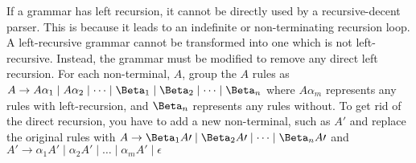 If a grammar has left recursion, it cannot be directly used by a recursive-decent parser. This is because it leads to an
 indefinite or non-terminating recursion loop. A left-recursive grammar cannot be transformed into one which is not left-
recursive. Instead, the grammar must be modified to remove any direct left recursion. For each non-terminal, $A$, group
 the $A$ rules as $A \rightarrow A\alpha_1 \mid A\alpha_2 \mid \dots \mid \Beta_1 \mid \Beta_2 \mid \dots \mid \Beta_n$
 where $A\alpha_m$ represents any rules with left-recursion, and $\Beta_n$ represents any rules without. To get rid of
 the direct recursion, you have to add a new non-terminal, such as $A\prime$ and replace the original rules with
 $A \rightarrow \Beta_1A\prime \mid \Beta_2A\prime \mid \dots \mid \Beta_nA\prime$ and
 $A\prime \rightarrow \alpha_1A\prime \mid \alpha_2A\prime \mid \dots \mid \alpha_mA\prime \mid \epsilon$
